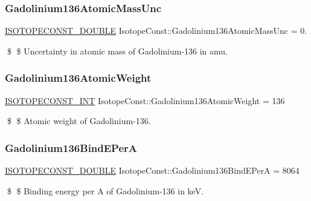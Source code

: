 \subsubsection{\texorpdfstring{Gadolinium136\+Atomic\+Mass\+Unc}{Gadolinium136AtomicMassUnc}}
{\footnotesize\ttfamily \mbox{\hyperlink{group___isotope_const-_macros_ga8f45a7272ce02c0b4c65c44636ed719a}{I\+S\+O\+T\+O\+P\+E\+C\+O\+N\+S\+T\+\_\+\+D\+O\+U\+B\+LE}} Isotope\+Const\+::\+Gadolinium136\+Atomic\+Mass\+Unc = 0.}

\$ \$ Uncertainty in atomic mass of Gadolinium-\/136 in amu. \mbox{\label{group___isotope_const-_gadolinium-_gd136_ga198a27f918d95476a1be4769c9e2b503}} 
\subsubsection{\texorpdfstring{Gadolinium136\+Atomic\+Weight}{Gadolinium136AtomicWeight}}
{\footnotesize\ttfamily \mbox{\hyperlink{group___isotope_const-_macros_ga5f18360b3e99483a35c32d789e62621c}{I\+S\+O\+T\+O\+P\+E\+C\+O\+N\+S\+T\+\_\+\+I\+NT}} Isotope\+Const\+::\+Gadolinium136\+Atomic\+Weight = 136}

\$ \$ Atomic weight of Gadolinium-\/136. \mbox{\label{group___isotope_const-_gadolinium-_gd136_gada5c14cc915221dd71511baaec48dc67}} 
\subsubsection{\texorpdfstring{Gadolinium136\+Bind\+E\+PerA}{Gadolinium136BindEPerA}}
{\footnotesize\ttfamily \mbox{\hyperlink{group___isotope_const-_macros_ga8f45a7272ce02c0b4c65c44636ed719a}{I\+S\+O\+T\+O\+P\+E\+C\+O\+N\+S\+T\+\_\+\+D\+O\+U\+B\+LE}} Isotope\+Const\+::\+Gadolinium136\+Bind\+E\+PerA = 8064}

\$ \$ Binding energy per A of Gadolinium-\/136 in keV. \mbox{\label{group___isotope_const-_gadolinium-_gd136_gab60c3983c6421e889fff6f7dcd7f159a}} 
